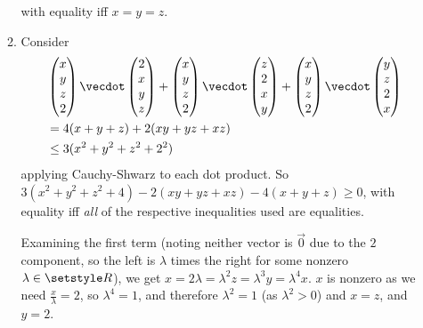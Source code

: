 \documentclass[fleqn,a4paper,11pt]{article}
\begin{document}
\begin{enumerate}[label=\textbf{\arabic*.}]
\begin{enumerate}[label=(\alph*)]
      with equality iff \(x = y = z\).
     \item Consider
      \begin{align*}
       &\begin{pmatrix}
        x \\ y \\ z \\ 2
       \end{pmatrix} \vecdot
       \begin{pmatrix}
        2 \\ x \\ y \\ z
       \end{pmatrix} +
       \begin{pmatrix}
        x \\ y \\ z \\ 2
       \end{pmatrix} \vecdot
       \begin{pmatrix}
        z \\ 2 \\ x \\ y
       \end{pmatrix} +
       \begin{pmatrix}
        x \\ y \\ z \\ 2
       \end{pmatrix} \vecdot
       \begin{pmatrix}
        y \\ z \\ 2 \\ x
       \end{pmatrix} \\
       &= 4(x + y + z) + 2(xy + yz + xz) \\
       &\le 3(x^2 + y^2 + z^2 + 2^2)
      \end{align*}
      applying Cauchy-Shwarz to each dot product. So \\
      \(3(x^2 + y^2 + z^2 + 4) - 2(xy + yz + xz) - 4(x + y + z) \ge 0\),
      with equality iff \emph{all} of the respective inequalities used are
      equalities.

      Examining the first term (noting neither vector is \(\vec 0\) due to the
      \(2\) component, so the left is \(\lambda\) times the right for some
      nonzero \(\lambda \in \Reals\)), we get
      \(x = 2\lambda = \lambda^2 z = \lambda^3 y = \lambda^4 x\). \(x\) is
      nonzero as we need \(\frac x\lambda = 2\), so \(\lambda^4 = 1\), and
      therefore \(\lambda^2 = 1\) (as \(\lambda^2 > 0\)) and \(x = z\), and
      \(y = 2\).


\end{enumerate}
\end{enumerate}
\end{document}
